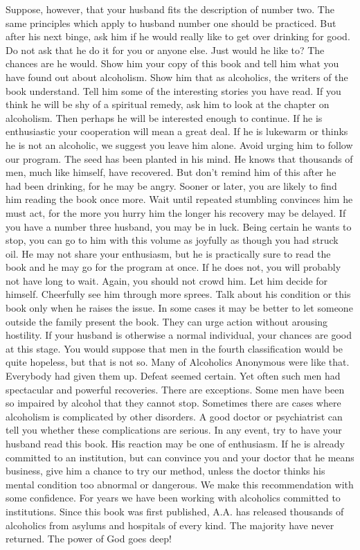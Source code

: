 \begin{biblechapter}
Suppose, however, that your husband fits the description of number two.  The same principles which apply to husband number one should be practiced.  But after his next binge, ask him if he would really like to get over drinking for good.  Do not ask that he do it for you or anyone else.  Just would he like to?
The chances are he would.  Show him your copy of this book and tell him what you have found out about alcoholism.  Show him that as alcoholics, the writers of the book understand.  Tell him some of the interesting stories you have read.  If you think he will be shy of a spiritual remedy, ask him to look at the chapter on alcoholism.  Then perhaps he will be interested enough to continue.
If he is enthusiastic your cooperation will mean a great deal.  If he is lukewarm or thinks he is not an alcoholic, we suggest you leave him alone.  Avoid urging him to follow our program.  The seed has been planted in his mind.  He knows that thousands of men, much like himself, have recovered.  But don't remind him of this after he had been drinking, for he may be angry.  Sooner or later, you are likely to find him reading the book once more.  Wait until repeated stumbling convinces him he must act, for the more you hurry him the longer his recovery may be delayed.
If you have a number three husband, you may be in luck.  Being certain he wants to stop, you can go to him with this volume as joyfully as though you had struck oil.  He may not share your enthusiasm, but he is practically sure to read the book and he may go for the program at once.  If he does not, you will probably not have long to wait.  Again, you should not crowd him.  Let him decide for himself.  Cheerfully see him through more sprees.  Talk about his condition or this book only when he raises the issue.  In some cases it may be better to let someone outside the family present the book.  They can urge action without arousing hostility.  If your husband is otherwise a normal individual, your chances are good at this stage.
You would suppose that men in the fourth classification would be quite hopeless, but that is not so.  Many of Alcoholics Anonymous were like that.  Everybody had given them up.  Defeat seemed certain.  Yet often such men had spectacular and powerful recoveries.
There are exceptions.  Some men have been so impaired by alcohol that they cannot stop.  Sometimes there are cases where alcoholism is complicated by other disorders.  A good doctor or psychiatrist can tell you whether these complications are serious.  In any event, try to have your husband read this book.  His reaction may be one of enthusiasm.  If he is already committed to an institution, but can convince you and your doctor that he means business, give him a chance to try our method, unless the doctor thinks his mental condition too abnormal or dangerous.  We make this recommendation with some confidence.  For years we have been working with alcoholics committed to institutions.  Since this book was first published, A.A. has released thousands of alcoholics from asylums and hospitals of every kind.  The majority have never returned.  The power of God goes deep!

\end{biblechapter}
